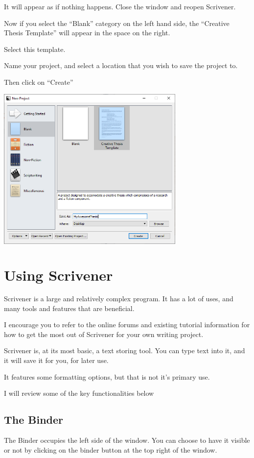 \documentclass{article}
\begin{document}
It will appear as if nothing happens. Close the window and reopen Scrivener.

Now if you select the ``Blank'' category on the left hand side, the ``Creative Thesis Template'' will appear in the space on the right.

Select this template.

Name your project, and select a location that you wish to save the project to.

Then click on ``Create''

\includegraphics[width=350px]{images/scriv004.PNG}


\section{Using Scrivener}

Scrivener is a large and relatively complex program. It has a lot of uses, and many tools and features that are beneficial. 

I encourage you to refer to the online forums and existing tutorial information for how to get the most out of Scrivener for your own writing project.

Scrivener is, at its most basic, a text storing tool. You can type text into it, and it will save it for you, for later use. 

It features some formatting options, but that is not it's primary use.

I will review some of the key functionalities below

\subsection{The Binder}

The Binder occupies the left side of the window. You can choose to have it visible or not by clicking on the binder button at the top right of the window.
\end{document}
